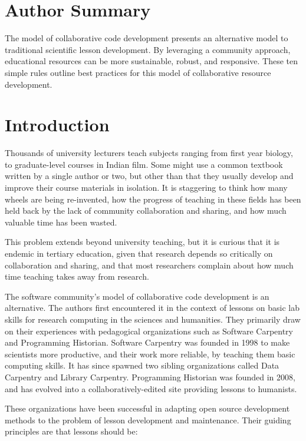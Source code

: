 \documentclass[10pt,letterpaper]{article}
\begin{document}
\section*{Author Summary}

The model of collaborative code development presents an 
alternative model to traditional scientific lesson 
development. By leveraging a community approach, educational 
resources can be more sustainable, robust, and responsive. 
These ten simple rules outline best practices for this model of 
collaborative resource development.

\section*{Introduction}

Thousands of university lecturers teach subjects ranging from first year biology,
to graduate-level courses in Indian film.
Some might use a common textbook written by a single author or two,
but other than that they usually develop and improve their course materials in isolation.
It is staggering to think how many wheels are being re-invented,
how the progress of teaching in these fields has been held back by
the lack of community collaboration and sharing,
and how much valuable time has been wasted.

This problem extends beyond university teaching,
but it is curious that it is endemic in tertiary education,
given that research depends so critically on collaboration and sharing,
and that most researchers complain about how much time teaching takes away from research.

The software community's model of collaborative code development is an alternative.
The authors first encountered it in the context of
lessons on basic lab skills for research computing
in the sciences and humanities. They primarily draw on
their experiences with pedagogical organizations such as
Software Carpentry and Programming Historian.
Software Carpentry was founded in 1998
to make scientists more productive,
and their work more reliable,
by teaching them basic computing skills.
It has since spawned two sibling organizations called Data Carpentry and Library Carpentry.
Programming Historian was founded in 2008,
and has evolved into a collaboratively-edited site providing lessons to humanists.

These organizations have been successful in adapting open source development methods
to the problem of lesson development and maintenance.
Their guiding principles are that lessons should be:
\end{document}
